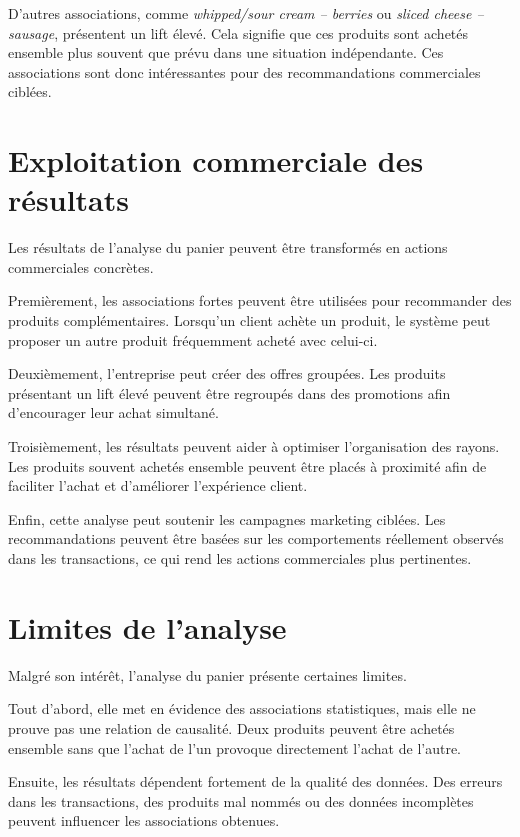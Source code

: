 \documentclass[12pt,a4paper,twoside]{report}
\begin{document}
D'autres associations, comme \textit{whipped/sour cream -- berries} ou \textit{sliced cheese -- sausage}, présentent un lift élevé. Cela signifie que ces produits sont achetés ensemble plus souvent que prévu dans une situation indépendante. Ces associations sont donc intéressantes pour des recommandations commerciales ciblées.

\section{Exploitation commerciale des résultats}

Les résultats de l'analyse du panier peuvent être transformés en actions commerciales concrètes.

Premièrement, les associations fortes peuvent être utilisées pour recommander des produits complémentaires. Lorsqu'un client achète un produit, le système peut proposer un autre produit fréquemment acheté avec celui-ci.

Deuxièmement, l'entreprise peut créer des offres groupées. Les produits présentant un lift élevé peuvent être regroupés dans des promotions afin d'encourager leur achat simultané.

Troisièmement, les résultats peuvent aider à optimiser l'organisation des rayons. Les produits souvent achetés ensemble peuvent être placés à proximité afin de faciliter l'achat et d'améliorer l'expérience client.

Enfin, cette analyse peut soutenir les campagnes marketing ciblées. Les recommandations peuvent être basées sur les comportements réellement observés dans les transactions, ce qui rend les actions commerciales plus pertinentes.

\section{Limites de l'analyse}

Malgré son intérêt, l'analyse du panier présente certaines limites.

Tout d'abord, elle met en évidence des associations statistiques, mais elle ne prouve pas une relation de causalité. Deux produits peuvent être achetés ensemble sans que l'achat de l'un provoque directement l'achat de l'autre.

Ensuite, les résultats dépendent fortement de la qualité des données. Des erreurs dans les transactions, des produits mal nommés ou des données incomplètes peuvent influencer les associations obtenues.
\end{document}
